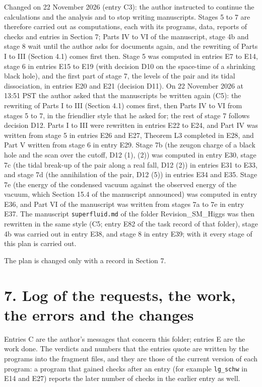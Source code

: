 \documentclass[
  10pt,
]{article}
\begin{document}
Changed on 22 November 2026 (entry C3): the author instructed to
continue the calculations and the analysis and to stop writing
manuscripts. Stages 5 to 7 are therefore carried out as computations,
each with its programs, data, reports of checks and entries in Section
7; Parts IV to VI of the manuscript, stage 4b and stage 8 wait until the
author asks for documents again, and the rewriting of Parts I to III
(Section 4.1) comes first then. Stage 5 was computed in entries E7 to
E14, stage 6 in entries E15 to E19 (with decision D10 on the space-time
of a shrinking black hole), and the first part of stage 7, the levels of
the pair and its tidal dissociation, in entries E20 and E21 (decision
D11). On 22 November 2026 at 13:51 PST the author asked that the
manuscripts be written again (C5): the rewriting of Parts I to III
(Section 4.1) comes first, then Parts IV to VI from stages 5 to 7, in
the friendlier style that he asked for; the rest of stage 7 follows
decision D12. Parts I to III were rewritten in entries E22 to E24, and
Part IV was written from stage 5 in entries E26 and E27, Theorem L3
completed in E28, and Part V written from stage 6 in entry E29. Stage 7b
(the zeugon charge of a black hole and the scan over the cutoff, D12
(1), (2)) was computed in entry E30, stage 7c (the tidal break-up of the
pair along a real fall, D12 (2)) in entries E31 to E33, and stage 7d
(the annihilation of the pair, D12 (5)) in entries E34 and E35. Stage 7e
(the energy of the condensed vacuum against the observed energy of the
vacuum, which Section 15.4 of the manuscript announced) was computed in
entry E36, and Part VI of the manuscript was written from stages 7a to
7e in entry E37. The manuscript \texttt{superfluid.md} of the folder
Revision\_SM\_Higgs was then rewritten in the same style (C5; entry E82
of the task record of that folder), stage 4b was carried out in entry
E38, and stage 8 in entry E39; with it every stage of this plan is
carried out.

The plan is changed only with a record in Section 7.

\hypertarget{log-of-the-requests-the-work-the-errors-and-the-changes}{%
\section{7. Log of the requests, the work, the errors and the
changes}\label{log-of-the-requests-the-work-the-errors-and-the-changes}}

Entries C are the author's messages that concern this folder; entries E
are the work done. The verdicts and numbers that the entries quote are
written by the programs into the fragment files, and they are those of
the current version of each program: a program that gained checks after
an entry (for example \texttt{lg\_schw} in E14 and E27) reports the
later number of checks in the earlier entry as well.
\end{document}

